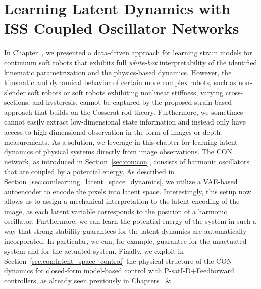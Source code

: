 \chapter{Learning Latent Dynamics with ISS Coupled Oscillator Networks}
\label{chp:con}

\begin{foreword}
    In Chapter~\circled{\ref{chp:pcsregression}}, we presented a data-driven approach for learning strain models for continuum soft robots that exhibits full \emph{white-box} interpretability of the identified kinematic parametrization and the physics-based dynamics.
    However, the kinematic and dynamical behavior of certain more complex robots, such as non-slender soft robots or soft robots exhibiting nonlinear stiffness, varying cross-sections, and hysteresis, cannot be captured by the proposed strain-based approach that builds on the Cosserat rod theory.
    Furthermore, we sometimes cannot easily extract low-dimensional state information and instead only have access to high-dimensional observation in the form of images or depth measurements.
    As a solution, we leverage in this chapter  for learning latent dynamics of physical systems directly from image observations. The \gls{CON} network, as introduced in Section~\ref{sec:con:con}, consists of harmonic oscillators that are coupled by a potential energy. As described in Section~\ref{sec:con:learning_latent_space_dynamics}, we utilize a \gls{VAE}-based autoencoder to encode the pixels into latent space. Interestingly, this setup now allows us to assign a mechanical interpretation to the latent encoding of the image, as each latent variable corresponds to the position of a harmonic oscillator. Furthermore, we can learn the potential energy of the system in such a way that strong stability guarantees for the latent dynamics are automatically incorporated. In particular, we can, for example, guarantee  for the unactuated system and  for the actuated system.
    Finally, we exploit in Section~\ref{sec:con:latent_space_control} the physical structure of the \gls{CON} dynamics for closed-form model-based control with P-satI-D+Feedforward controllers, as already seen previously in Chapters~\circled{\ref{chp:hsacontrol}} \& \circled{\ref{chp:pcsregression}}.
\end{foreword}

